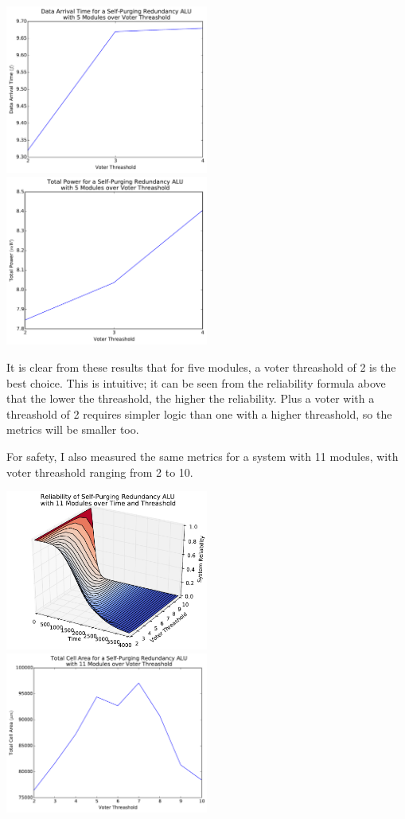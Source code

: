 \documentclass[a4paper,12pt]{article}
\begin{document}
    \includegraphics[width=0.5\textwidth]{time_5}
    \includegraphics[width=0.5\textwidth]{power_5}

    It is clear from these results that for five modules, a voter threashold of 2 is the best choice. This is intuitive; it can be seen from the reliability formula above that the lower the threashold, the higher the reliability. Plus a voter with a threashold of 2 requires simpler logic than one with a higher threashold, so the metrics will be smaller too.

    For safety, I also measured the same metrics for a system with 11 modules, with voter threashold ranging from 2 to 10.

    \includegraphics[width=0.5\textwidth]{reliability_11}
    \includegraphics[width=0.5\textwidth]{area_11}
\end{document}
